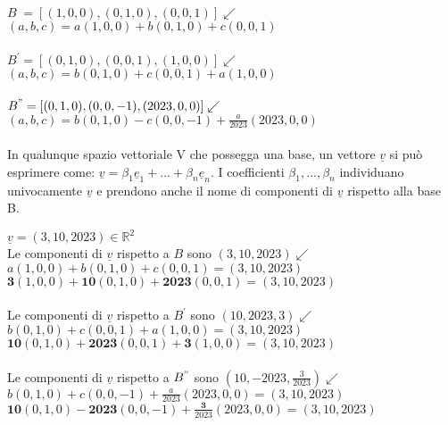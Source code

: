 \begin{proposizione}
	\phantom{}\\
	$B^{\phantom{'}}=[(1,0,0),(0,1,0),(0,0,1)]\swarrow$\\
	\phantom{texttt}$(a,b,c)=a(1,0,0)+b(0,1,0)+c(0,0,1)$\\\\
	$B^{'}=[(0,1,0),(0,0,1),(1,0,0)]\swarrow$\\
	\phantom{texttt}$(a,b,c)=b(0,1,0)+c(0,0,1)+a(1,0,0)$\\\\
	$B^{"}=[(0,1,0),(0,0,-1),(2023,0,0)]\swarrow$\\
	\phantom{texttt}$(a,b,c)=b(0,1,0)-c(0,0,-1)+\frac{a}{2023}(2023,0,0)$\\\\
	In qualunque spazio vettoriale V che possegga una base, un vettore $\underline{v}$ si può esprimere come: $\underline{v}=\beta_1\underline{e}_1+...+\beta_n\underline{e}_n$. I coefficienti $\beta_1,...,\beta_n$ individuano univocamente $\underline{v}$ e prendono anche il nome di componenti di $\underline{v}$ rispetto alla base B.
	\begin{es}
		$\underline{v}=(3,10,2023)\in\mathbb{R}^{2}$\\
		Le componenti di $\underline{v}$ rispetto a $B$ sono $(3,10,2023) \swarrow$\\
		$a(1,0,0)+b(0,1,0)+c(0,0,1)=(3,10,2023)$\\
		$\textbf{3}(1,0,0)+\textbf{10}(0,1,0)+\textbf{2023}(0,0,1)=(3,10,2023)$\\\\
		Le componenti di $\underline{v}$ rispetto a $B^{'}$ sono $(10,2023,3) \swarrow$\\
		$b(0,1,0)+c(0,0,1)+a(1,0,0)=(3,10,2023)$\\
		$\textbf{10}(0,1,0)+\textbf{2023}(0,0,1)+\textbf{3}(1,0,0)=(3,10,2023)$\\\\
		Le componenti di $\underline{v}$ rispetto a $B^{"}$ sono $(10,-2023,\frac{3}{2023}) \swarrow$\\
		$b(0,1,0)+c(0,0,-1)+\frac{a}{2023}(2023,0,0)=(3,10,2023)$\\
		$\textbf{10}(0,1,0)-\textbf{2023}(0,0,-1)+\frac{\textbf{3}}{2023}(2023,0,0)=(3,10,2023)$
	\end{es}
	\begin{es}
		$B=[\begin{pmatrix}
			1 & 1\\
			0 & 0
		\end{pmatrix},\begin{pmatrix}

\end{pmatrix}
\end{es}
\end{proposizione}
